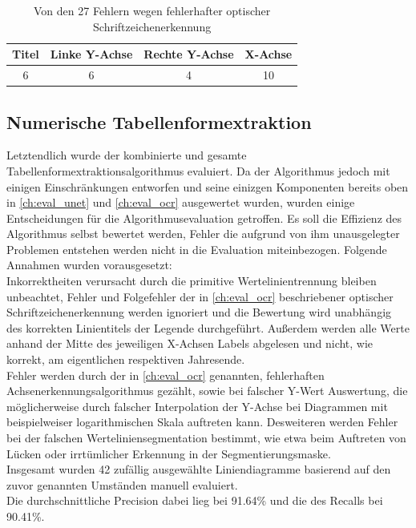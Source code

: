 \begin{table}[H]
    \centering
    \begin{tabular}{|c|c|c|c|}
        \hline
        \rowcolor[HTML]{EFEFEF}
        Titel & Linke Y-Achse & Rechte Y-Achse & X-Achse \\ \hline
        6     & 6             & 4              & 10      \\ \hline
    \end{tabular}
    \caption{Von den 27 Fehlern wegen fehlerhafter optischer Schriftzeichenerkennung}
    \label{tb:ocr2}
\end{table}

\subsection{Numerische Tabellenformextraktion}

Letztendlich wurde der kombinierte und gesamte Tabellenformextraktionsalgorithmus evaluiert. Da der Algorithmus jedoch mit einigen Einschränkungen entworfen und seine einizgen Komponenten bereits oben in \ref{ch:eval_unet} und \ref{ch:eval_ocr} ausgewertet wurden, wurden einige Entscheidungen für die Algorithmusevaluation getroffen. Es soll die Effizienz des Algorithmus selbst bewertet werden, Fehler die aufgrund von ihm unausgelegter Problemen entstehen werden nicht in die Evaluation miteinbezogen. Folgende Annahmen wurden vorausgesetzt:
\\
Inkorrektheiten verursacht durch die primitive Wertelinientrennung bleiben unbeachtet, Fehler und Folgefehler der in \ref{ch:eval_ocr} beschriebener optischer Schriftzeichenerkennung werden ignoriert und die Bewertung wird unabhängig des korrekten Linientitels der Legende durchgeführt. Außerdem werden alle Werte anhand der Mitte des jeweiligen X-Achsen Labels abgelesen und nicht, wie korrekt, am eigentlichen respektiven Jahresende.
\\
Fehler werden durch der in \ref{ch:eval_ocr} genannten, fehlerhaften Achsenerkennungsalgorithmus gezählt, sowie bei falscher Y-Wert Auswertung, die möglicherweise durch falscher Interpolation der Y-Achse bei Diagrammen mit beispielweiser logarithmischen Skala auftreten kann. Desweiteren werden Fehler bei der falschen Werteliniensegmentation bestimmt, wie etwa beim Auftreten von Lücken oder irrtümlicher Erkennung in der Segmentierungsmaske.
\\
Insgesamt wurden 42 zufällig ausgewählte Liniendiagramme basierend auf den zuvor genannten Umständen manuell evaluiert.
\\
Die durchschnittliche Precision dabei lieg bei 91.64\% und die des Recalls bei 90.41\%.


